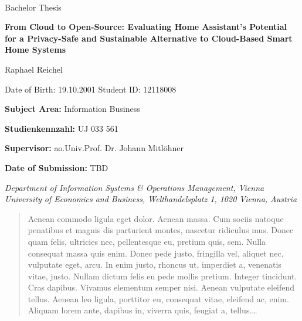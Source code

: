 \documentclass[a4paper, 12pt, twppages]{article}
\newcommand\BackgroundPic{%
\put(0,0){%
\parbox[b][\paperheight]{\paperwidth}{%
\vfill
\centering
\texttt{[image: background.pdf]}%
\vfill
}}}
\begin{document}

\pagebreak

\AddToShipoutPicture*{\BackgroundPic}
\thispagestyle{fancy}

{\vspace{2cm}~}
{\vspace{2cm}}

{\noindent\large Bachelor Thesis}


\vspace{1cm}

{\noindent\huge\textbf{From Cloud to Open-Source: Evaluating Home Assistant's Potential for a Privacy-Safe and Sustainable Alternative to Cloud-Based Smart Home Systems}}

\bigskip

{\noindent\LARGE Raphael Reichel}

\bigskip
{\noindent\small Date of Birth: 19.10.2001}\newline
{\noindent\small Student ID: 12118008}

\bigskip
{\vspace{2cm}}
{\noindent\large {\bf Subject Area:} Information Business}

\bigskip
{\noindent\large {\bf Studienkennzahl:} UJ 033 561}

\bigskip


{\noindent\large {\bf Supervisor:} ao.Univ.Prof. Dr. Johann Mitl\"ohner}

\bigskip

{\noindent\large {\bf Date of Submission:} TBD}

\bigskip\bigskip\bigskip\bigskip\bigskip\bigskip

{\em\noindent Department of Information Systems \& Operations Management, Vienna University of
Economics and Business, Welthandelsplatz 1, 1020 Vienna, Austria
}


\pagebreak
\tableofcontents
\pagebreak
\listoffigures
\listoftables
\pagebreak


\begin{abstract}

Aenean commodo ligula eget dolor. Aenean massa. Cum sociis natoque penatibus et magnis dis parturient montes, nascetur ridiculus mus. Donec quam felis, ultricies nec, pellentesque eu, pretium quis, sem. Nulla consequat massa quis enim. Donec pede justo, fringilla vel, aliquet nec, vulputate eget, arcu. In enim justo, rhoncus ut, imperdiet a, venenatis vitae, justo. Nullam dictum felis eu pede mollis pretium. Integer tincidunt. Cras dapibus. Vivamus elementum semper nisi. Aenean vulputate eleifend tellus. Aenean leo ligula, porttitor eu, consequat vitae, eleifend ac, enim. Aliquam lorem ante, dapibus in, viverra quis, feugiat a, tellus.\dots
\end{abstract}

\pagebreak


\setlength{\parskip}{0.556em} %



\newpage
% 
% 
\printbibliography
\end{document}
